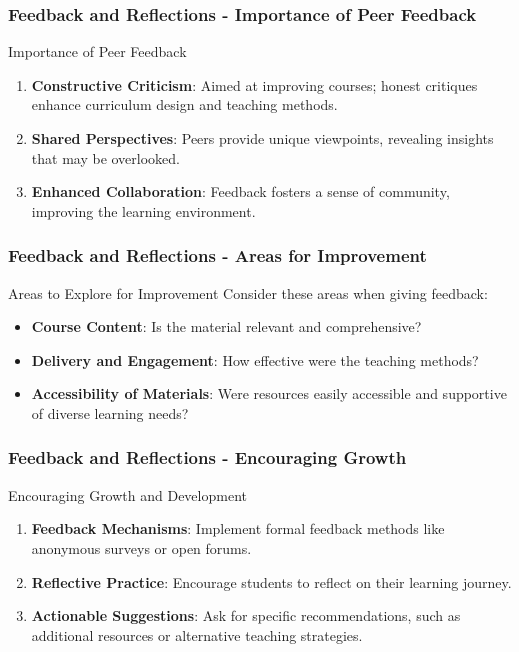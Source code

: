 \documentclass[aspectratio=169]{beamer}
\begin{document}
\begin{frame}[fragile]
    \frametitle{Feedback and Reflections - Importance of Peer Feedback}
    \begin{block}{Importance of Peer Feedback}
        \begin{enumerate}
            \item \textbf{Constructive Criticism}: Aimed at improving courses; honest critiques enhance curriculum design and teaching methods.
            
            \item \textbf{Shared Perspectives}: Peers provide unique viewpoints, revealing insights that may be overlooked.
            
            \item \textbf{Enhanced Collaboration}: Feedback fosters a sense of community, improving the learning environment.
        \end{enumerate}
    \end{block}
\end{frame}

\begin{frame}[fragile]
    \frametitle{Feedback and Reflections - Areas for Improvement}
    \begin{block}{Areas to Explore for Improvement}
        Consider these areas when giving feedback:
        \begin{itemize}
            \item \textbf{Course Content}: Is the material relevant and comprehensive? 
            \item \textbf{Delivery and Engagement}: How effective were the teaching methods? 
            \item \textbf{Accessibility of Materials}: Were resources easily accessible and supportive of diverse learning needs?
        \end{itemize}
    \end{block}
\end{frame}

\begin{frame}[fragile]
    \frametitle{Feedback and Reflections - Encouraging Growth}
    \begin{block}{Encouraging Growth and Development}
        \begin{enumerate}
            \item \textbf{Feedback Mechanisms}: Implement formal feedback methods like anonymous surveys or open forums.
            \item \textbf{Reflective Practice}: Encourage students to reflect on their learning journey.
            \item \textbf{Actionable Suggestions}: Ask for specific recommendations, such as additional resources or alternative teaching strategies.
        \end{enumerate}
    \end{block}
\end{frame}
\end{document}

